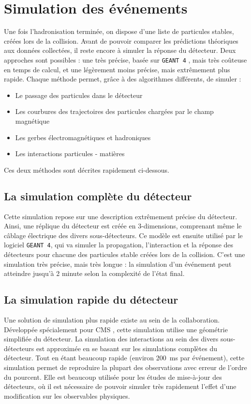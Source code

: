 \section{Simulation des événements}

Une fois l'hadronisation terminée, on dispose d'une liste de particules stables, créées lors de la collision. Avant de pouvoir comparer les prédictions théoriques aux données collectées, il reste encore à simuler la réponse du détecteur. Deux approches sont possibles : une très précise, basée sur \texttt{GEANT 4} \citep{Agostinelli2003250}, mais très coûteuse en temps de calcul, et une légèrement moins précise, mais extrêmement plus rapide. Chaque méthode permet, grâce à des algorithmes différents, de simuler :
\begin{itemize}
    \item Le passage des particules dans le détecteur
    \item Les courbures des trajectoires des particules chargées par le champ magnétique
    \item Les gerbes électromagnétiques et hadroniques
    \item Les interactions particules - matières
\end{itemize}

Ces deux méthodes sont décrites rapidement ci-dessous.

\subsection{La simulation complète du détecteur}

Cette simulation repose sur une description extrêmement précise du détecteur. Ainsi, une réplique du détecteur est créée en 3-dimensions, comprenant même le câblage électrique des divers sous-détecteurs. Ce modèle est ensuite utilisé par le logiciel \texttt{GEANT 4}, qui va simuler la propagation, l'interaction et la réponse des détecteurs pour chacune des particules stable créées lors de la collision. C'est une simulation très précise, mais très longue : la simulation d'un événement peut atteindre jusqu'à 2 minute selon la complexité de l'état final.

\subsection{La simulation rapide du détecteur}

Une solution de simulation plus rapide existe au sein de la collaboration. Développée spécialement pour CMS \citep{1742-6596-219-3-032053}, cette simulation utilise une géométrie simplifiée du détecteur. La simulation des interactions au sein des divers sous-détecteurs est approximée en se basant sur les simulations complètes du détecteur. Tout en étant beaucoup rapide (environ \SI{200}{\ms} par événement), cette simulation permet de reproduire la plupart des observations avec erreur de l'ordre du pourcent.  Elle est beaucoup utilisée pour les études de mise-à-jour des détecteurs, où il est nécessaire de pouvoir simuler très rapidement l'effet d'une modification sur les observables physiques.

